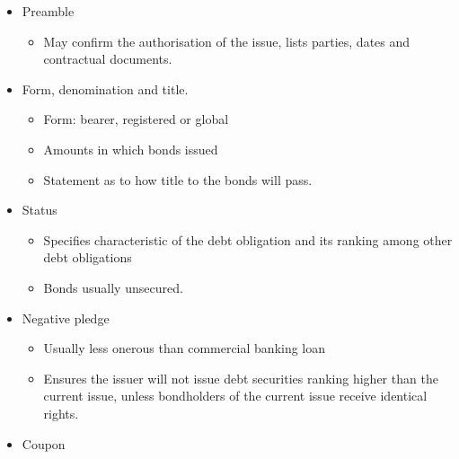 \documentclass[
]{article}
\providecommand{\tightlist}{%
  \setlength{\itemsep}{0pt}\setlength{\parskip}{0pt}}
\begin{document}
\begin{itemize}
\tightlist
\item
  Preamble

  \begin{itemize}
  \tightlist
  \item
    May confirm the authorisation of the issue, lists parties, dates and
    contractual documents.
  \end{itemize}
\item
  Form, denomination and title.

  \begin{itemize}
  \tightlist
  \item
    Form: bearer, registered or global
  \item
    Amounts in which bonds issued
  \item
    Statement as to how title to the bonds will pass.
  \end{itemize}
\item
  Status

  \begin{itemize}
  \tightlist
  \item
    Specifies characteristic of the debt obligation and its ranking
    among other debt obligations
  \item
    Bonds usually unsecured.
  \end{itemize}
\item
  Negative pledge

  \begin{itemize}
  \tightlist
  \item
    Usually less onerous than commercial banking loan
  \item
    Ensures the issuer will not issue debt securities ranking higher
    than the current issue, unless bondholders of the current issue
    receive identical rights.
  \end{itemize}
\item
  Coupon


\end{itemize}
\end{document}
